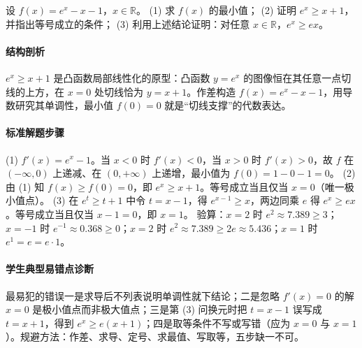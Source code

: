 \begin{problem}
设 $f(x)=e^x-x-1$，$x\in\mathbb R$。
(1) 求 $f(x)$ 的最小值；
(2) 证明 $e^x\ge x+1$，并指出等号成立的条件；
(3) 利用上述结论证明：对任意 $x\in\mathbb R$，$e^x\ge ex$。
\end{problem}
\begin{solution}
\paragraph{结构剖析}
$e^x\ge x+1$ 是凸函数局部线性化的原型：凸函数 $y=e^x$ 的图像恒在其任意一点切线的上方，在 $x=0$ 处切线恰为 $y=x+1$。作差构造 $f(x)=e^x-x-1$，用导数研究其单调性，最小值 $f(0)=0$ 就是“切线支撑”的代数表达。
\paragraph{标准解题步骤}
(1) $f'(x)=e^x-1$。当 $x<0$ 时 $f'(x)<0$，当 $x>0$ 时 $f'(x)>0$，故 $f$ 在 $(-\infty,0)$ 上递减、在 $(0,+\infty)$ 上递增，最小值为 $f(0)=1-0-1=0$。
(2) 由 (1) 知 $f(x)\ge f(0)=0$，即 $e^x\ge x+1$。等号成立当且仅当 $x=0$（唯一极小值点）。
(3) 在 $e^t\ge t+1$ 中令 $t=x-1$，得 $e^{x-1}\ge x$，两边同乘 $e$ 得 $e^x\ge ex$。等号成立当且仅当 $x-1=0$，即 $x=1$。
验算：$x=2$ 时 $e^2\approx7.389\ge3$；$x=-1$ 时 $e^{-1}\approx0.368\ge0$；$x=2$ 时 $e^2\approx7.389\ge2e\approx5.436$；$x=1$ 时 $e^1=e=e\cdot1$。
\paragraph{学生典型易错点诊断}
最易犯的错误一是求导后不列表说明单调性就下结论；二是忽略 $f'(x)=0$ 的解 $x=0$ 是极小值点而非极大值点；三是第 (3) 问换元时把 $t=x-1$ 误写成 $t=x+1$，得到 $e^x\ge e(x+1)$；四是取等条件不写或写错（应为 $x=0$ 与 $x=1$）。规避方法：作差、求导、定号、求最值、写取等，五步缺一不可。
\end{solution}

